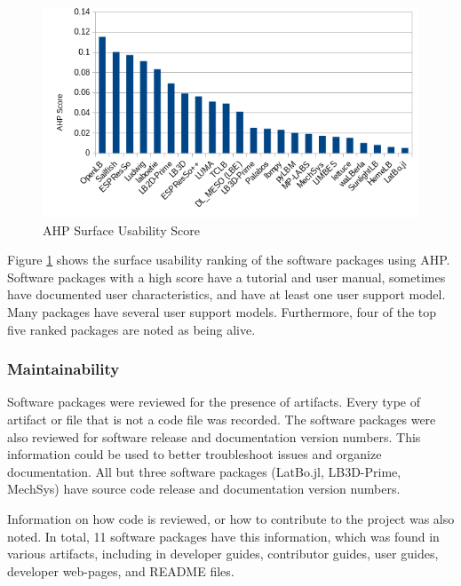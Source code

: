 \documentclass[12pt, notitlepage]{article}
\begin{document}
\begin{figure}[h!]
	\begin{center}
		\includegraphics[width=1.0\textwidth]{usability_chart}
		\caption{AHP Surface Usability Score}
		\label{Fig_Usability}
	\end{center}
\end{figure}

Figure \ref{Fig_Usability} shows the surface usability ranking of the software packages using AHP. Software packages with a high score have a tutorial and user manual, sometimes have documented user characteristics, and have at least one user support model. Many packages have several user support models. Furthermore, four of the top five ranked packages are noted as being alive. 

\subsubsection{Maintainability}

Software packages were reviewed for the presence of artifacts. Every type of artifact or file that is not a code file was recorded. The software packages were also reviewed for software release and documentation version numbers. This information could be used to better troubleshoot issues and organize documentation. All but three software packages (LatBo.jl, LB3D-Prime, MechSys) have source code release and documentation version numbers.

Information on how code is reviewed, or how to contribute to the project was also noted. In total, 11 software packages have this information, which was found in various artifacts, including in developer guides, contributor guides, user guides, developer web-pages, and README files. 
\end{document}

